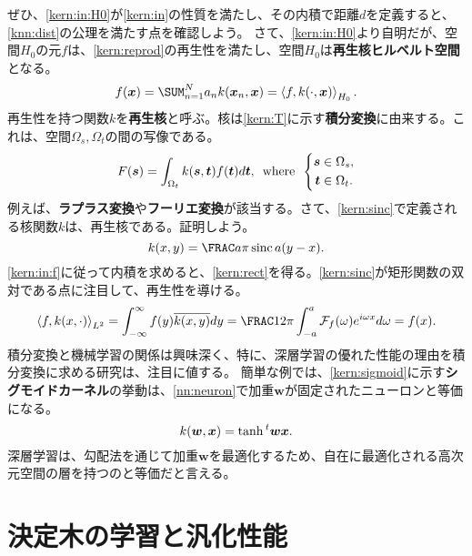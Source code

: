 \documentclass[10pt,a4paper]{book}
\begin{document}
%
ぜひ、\eqref{kern:in:H0}が\eqref{kern:in}の性質を満たし、その内積で距離$d$を定義すると、\eqref{knn:dist}の公理を満たす点を確認しよう。
さて、\eqref{kern:in:H0}より自明だが、空間$H_0$の元$f$は、\eqref{kern:reprod}の再生性を満たし、空間$H_0$は\textbf{再生核ヒルベルト空間}となる。
%
\begin{equation}
\label{eq:kern:reprod}
f(\bm{x}) = \sum_{n=1}^N a_n k(\bm{x}_n,\bm{x}) = \iprod{f}{k(\cdot,\bm{x})}_{H_0}.
\end{equation}
%
再生性を持つ関数$k$を\textbf{再生核}と呼ぶ。核は\eqref{kern:T}に示す\textbf{積分変換}に由来する。これは、空間$\Omega_s,\Omega_t$の間の写像である。
%
\begin{equation}
\label{eq:kern:T}
F(\bm{s}) = \int_{\Omega_t} k(\bm{s}, \bm{t}) f(\bm{t}) d\bm{t},
\enspace\mathrm{where}\enspace
\left\{
\begin{aligned}
\bm{s} &\in \Omega_s,\\
\bm{t} &\in \Omega_t.
\end{aligned}
\right.
\end{equation}
%
例えば、\textbf{ラプラス変換}や\textbf{フーリエ変換}が該当する。さて、\eqref{kern:sinc}で定義される核関数$k$は、再生核である。証明しよう。
%
\begin{equation}
\label{eq:kern:sinc}
k(x,y) = \frac{a}{\pi} \sinc a(y-x).
\end{equation}
%
\eqref{kern:in:f}に従って内積を求めると、\eqref{kern:rect}を得る。\eqref{kern:sinc}が矩形関数の双対である点に注目して、再生性を導ける。
%
\begin{equation}
\label{eq:kern:rect}
\iprod{f}{k(x,\cdot)}_{L^2} =
\int_{-\infty}^\infty f(y) \overline{k(x,y)} dy =
\frac{1}{2\pi} \int_{-a}^a \mathcal{F}_f(\omega) e^{i \omega x} d\omega =
f(x).
\end{equation}
%
積分変換と機械学習の関係は興味深く、特に、深層学習の優れた性能の理由を積分変換に求める研究は、注目に値する。
簡単な例では、\eqref{kern:sigmoid}に示す\textbf{シグモイドカーネル}の挙動は、\eqref{nn:neuron}で加重$\bm{w}$が固定されたニューロンと等価になる。
%
\begin{equation}
\label{eq:kern:sigmoid}
k(\bm{w},\bm{x}) = \tanh {}^t\bm{w} \bm{x}.
\end{equation}
%
深層学習は、勾配法を通じて加重$\bm{w}$を最適化するため、自在に最適化される高次元空間の層を持つのと等価だと言える。

\chapter{決定木の学習と汎化性能\label{chap:dt}}
\end{document}
